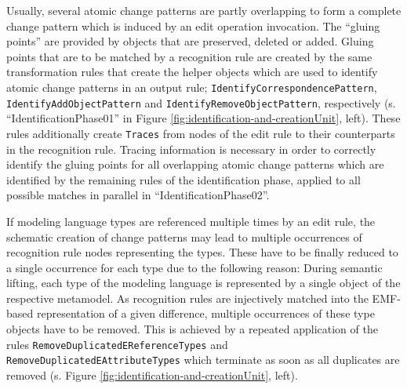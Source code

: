 \documentclass{llncs}
\begin{document}
Usually, several atomic change patterns are partly overlapping
to form a complete change pattern which is induced by an edit operation invocation.
The ``gluing points'' are provided by objects that are
preserved, deleted or added. Gluing points that are to be matched
by a recognition rule are created by the same transformation rules 
that create the helper objects which are used to identify
atomic change patterns in an output rule;
\texttt{IdentifyCorrespondencePattern}, 
\texttt{IdentifyAddObjectPattern} and \texttt{IdentifyRemoveObjectPattern}, 
respectively (s. ``IdentificationPhase01'' in Figure \ref{fig:identification-and-creationUnit}, left).
These rules additionally create \texttt{Traces} from nodes of
the edit rule to their counterparts in the recognition rule.
Tracing information is necessary in order to correctly identify the gluing points
for all overlapping atomic change patterns which are identified
by the remaining rules of the identification phase, applied
to all possible matches in parallel in ``IdentificationPhase02''.

If modeling language types are referenced multiple times by an edit rule, 
the schematic creation of change patterns may lead to
multiple occurrences of recognition rule nodes representing
the types. These have to be finally reduced to a single occurrence 
for each type due to the following reason: 
During semantic lifting, each type of the modeling language is
represented by a single object of the respective metamodel.
As recognition rules are injectively matched into the
EMF-based representation of a given difference, multiple occurrences of these
type objects have to be removed. This is achieved by
a repeated application of the rules \texttt{RemoveDuplicatedEReferenceTypes}
and \texttt{RemoveDuplicatedEAttributeTypes} which terminate
as soon as all duplicates are removed (s. Figure \ref{fig:identification-and-creationUnit}, left).
\end{document}
